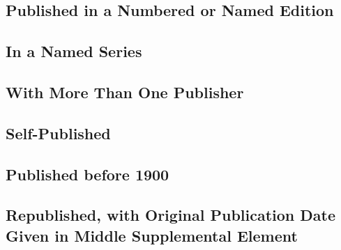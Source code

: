 \documentclass{article}
\begin{document}
\subsection{Published in a Numbered or Named Edition} %
\label{ssub:published_in_a_numbered_or_named_edition}
\begin{refsection}
	\nocite{Milkis:1994vv,Wollstonecraft:2009uf}
	\printbibliography[heading=none]
\end{refsection}
\subsection{In a Named Series} %
\label{ssub:in_a_named_series}
\begin{refsection}
	\nocite{Neruda:1991wq}
	\printbibliography[heading=none]
\end{refsection}
\subsection{With More Than One Publisher} %
\label{ssub:with_more_than_one_publisher}
\begin{refsection}
	\nocite{Tomlinson:2002tc}
	\printbibliography[heading=none]
\end{refsection}
\subsection{Self-Published} %
\label{ssub:self_published}
\begin{refsection}
	\nocite{Hocking:2010tz}
	\printbibliography[heading=none]
\end{refsection}
\subsection{Published before 1900} %
\label{ssub:published_before_1900}
\begin{refsection}
	\nocite{Goethe:1875vw}
	\printbibliography[heading=none]
\end{refsection}
\subsection{Republished, with Original Publication Date Given in Middle Supplemental Element} %
\label{ssub:republished_with_original_publication_date_given_in_middle_supplemental_element}
\begin{refsection}
	\nocite{London:1990tn}
	\printbibliography[heading=none]
\end{refsection}
\end{document}
